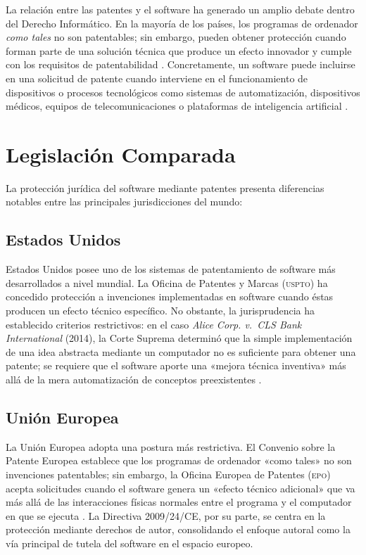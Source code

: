 \documentclass[11pt,a4paper]{report}
\begin{document}
La relación entre las patentes y el software ha generado un amplio debate dentro del Derecho Informático. En la mayoría de los países, los programas de ordenador \emph{como tales} no son patentables; sin embargo, pueden obtener protección cuando forman parte de una solución técnica que produce un efecto innovador y cumple con los requisitos de patentabilidad \citep{ompi2024}. Concretamente, un software puede incluirse en una solicitud de patente cuando interviene en el funcionamiento de dispositivos o procesos tecnológicos como sistemas de automatización, dispositivos médicos, equipos de telecomunicaciones o plataformas de inteligencia artificial \citep{euipo2022}.

\section{Legislación Comparada}

La protección jurídica del software mediante patentes presenta diferencias notables entre las principales jurisdicciones del mundo:

\subsection{Estados Unidos}

Estados Unidos posee uno de los sistemas de patentamiento de software más desarrollados a nivel mundial. La Oficina de Patentes y Marcas (\textsc{uspto}) ha concedido protección a invenciones implementadas en software cuando éstas producen un efecto técnico específico. No obstante, la jurisprudencia ha establecido criterios restrictivos: en el caso \textit{Alice Corp. v.\ CLS Bank International} (2014), la Corte Suprema determinó que la simple implementación de una idea abstracta mediante un computador no es suficiente para obtener una patente; se requiere que el software aporte una «mejora técnica inventiva» más allá de la mera automatización de conceptos preexistentes \citep{uspto2024}.

\subsection{Unión Europea}

La Unión Europea adopta una postura más restrictiva. El Convenio sobre la Patente Europea establece que los programas de ordenador «como tales» no son invenciones patentables; sin embargo, la Oficina Europea de Patentes (\textsc{epo}) acepta solicitudes cuando el software genera un «efecto técnico adicional» que va más allá de las interacciones físicas normales entre el programa y el computador en que se ejecuta \citep{epo2024}. La Directiva 2009/24/CE, por su parte, se centra en la protección mediante derechos de autor, consolidando el enfoque autoral como la vía principal de tutela del software en el espacio europeo.
\end{document}
